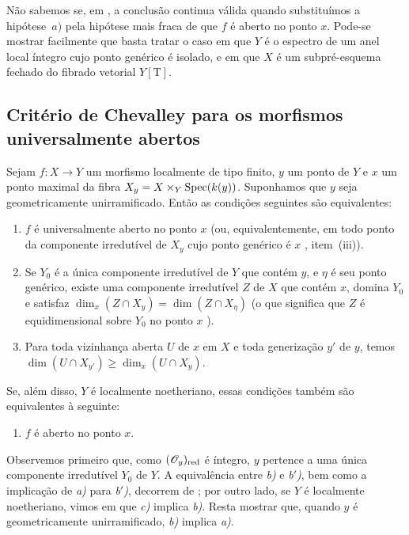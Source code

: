 \begin{remark}[14.3.14]
\label{IV.14.3.14}
Não sabemos se, em , a conclusão continua válida quando substituímos a hipótese~$a)$ pela hipótese mais fraca de que $f$ é aberto no ponto $x$.
Pode-se mostrar facilmente que basta tratar o caso em que $Y$ é o espectro de um anel local íntegro cujo ponto genérico é isolado, e em que $X$ é um subpré-esquema fechado do fibrado vetorial $Y[\mathrm{T}]$.
\end{remark}

\subsection{Critério de Chevalley para os morfismos universalmente abertos}
\label{subsection:IV.14.4}

\begin{theorem}[14.4.1]
\label{IV.14.4.1}
Sejam $f:X\to Y$ um morfismo localmente de tipo finito, $y$ um ponto de $Y$ e $x$ um ponto maximal da fibra $X_y=X\times_Y\operatorname{Spec}(k(y))$.
Suponhamos que $y$ seja geometricamente unirramificado.
Então as condições seguintes são equivalentes:
\begin{enumerate}[label=\emph{\alph*)}]
  \item $f$ é universalmente aberto no ponto $x$ (ou, equivalentemente, em todo ponto da componente irredutível de $X_y$ cujo ponto genérico é $x$ , item~(iii)).


  \item Se $Y_0$ é a única componente irredutível de $Y$ que contém $y$, e $\eta$ é seu ponto genérico, existe uma componente irredutível $Z$ de $X$ que contém $x$, domina $Y_0$ e satisfaz $\dim_x(Z\cap X_y)=\dim(Z\cap X_\eta)$ (o que significa que $Z$ é equidimensional sobre $Y_0$ no ponto $x$ ).
  \item[\emph{b$'$)}] Para toda vizinhança aberta $U$ de $x$ em $X$ e toda generização $y'$ de $y$, temos $\dim(U\cap X_{y'})\geq\dim_x(U\cap X_y)$.
\end{enumerate}
Se, além disso, $Y$ é localmente noetheriano, essas condições também são equivalentes à seguinte:
\begin{enumerate}[label=\emph{\alph*)}]
  \item[\emph{c)}] $f$ é aberto no ponto $x$.
\end{enumerate}
\end{theorem}

Observemos primeiro que, como $(\mathscr{O}_y)_{\mathrm{red}}$ é íntegro, $y$ pertence a uma única componente irredutível $Y_0$ de $Y$.
A equivalência entre \emph{b)} e \emph{b$'$)}, bem como a implicação de \emph{a)} para \emph{b$'$)}, decorrem de ; por outro lado, se $Y$ é localmente noetheriano, vimos em  que \emph{c)} implica \emph{b)}.
Resta mostrar que, quando $y$ é geometricamente unirramificado, \emph{b)} implica \emph{a)}.

